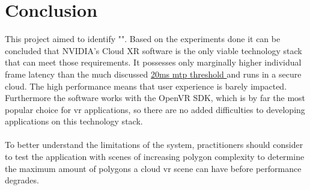 \section{Conclusion}

This project aimed to identify "\textit{}". Based on the experiments done it can be concluded that NVIDIA's Cloud XR software \parencite{cloudxr} is the only viable technology stack that can meet those requirements. It possesses only marginally higher individual frame latency than the much discussed \hyperref[sec:theo]{20\acrshort{ms} \acrshort{mtp} threshold } and runs in a secure cloud. The high performance means that user experience is barely impacted. Furthermore the software works with the OpenVR SDK, which is by far the most popular choice for \acrshort{vr} applications, so there are no added difficulties to developing applications on this technology stack.
\\ \\
To better understand the limitations of the system, practitioners should consider to test the application with scenes of increasing polygon complexity to determine the maximum amount of polygons a cloud \acrshort{vr} scene can have before performance degrades.